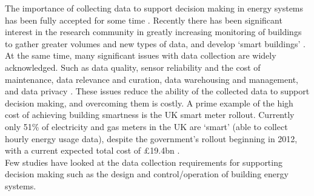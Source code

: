 



The importance of collecting data to support decision making in energy systems has been fully accepted for some time . Recently there has been significant interest in the research community in greatly increasing monitoring of buildings to gather greater volumes and new types of data, and develop `smart buildings' . At the same time, many significant issues with data collection are widely acknowledged. Such as data quality, sensor reliability and the cost of maintenance, data relevance and curation, data warehousing and management, and data privacy . These issues reduce the ability of the collected data to support decision making, and overcoming them is costly. A prime example of the high cost of achieving building smartness is the UK smart meter rollout. Currently only 51\% of electricity and gas meters in the UK are  ‘smart’ (able to collect hourly energy usage data), despite the government's rollout beginning in 2012, with a current expected total cost of £19.4bn .\\

Few studies have looked at the data collection requirements for supporting decision making such as the design and control/operation of building energy systems.

